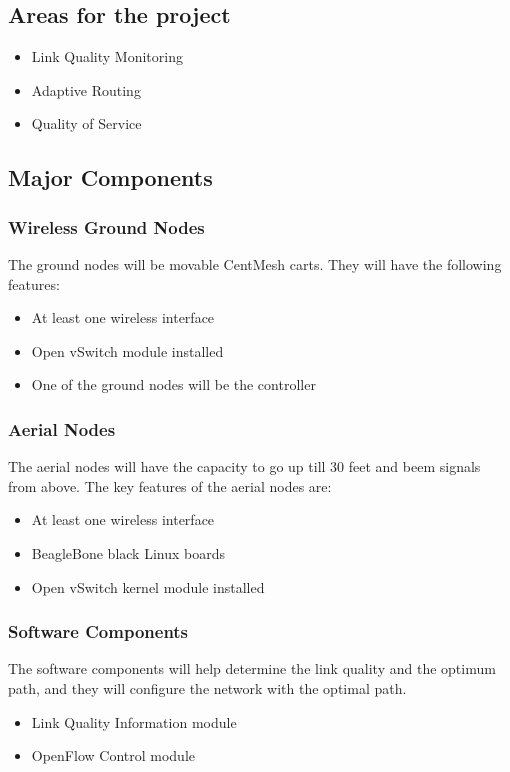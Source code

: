 \documentclass{article}
\begin{document}
\subsection{Areas for the project}
\begin{itemize}
\item Link Quality Monitoring
\item Adaptive Routing
\item Quality of Service
\end{itemize}
\subsection{Major Components}
\subsubsection{Wireless Ground Nodes}
The ground nodes will be movable CentMesh carts. They will have the following features:
\begin{itemize}
\item At least one wireless interface
\item Open vSwitch module installed
\item One of the ground nodes will be the controller
\end{itemize}
\subsubsection{Aerial Nodes}
The aerial nodes will have the capacity to go up till 30 feet and beem signals from above. The key features of the
aerial nodes are:
\begin{itemize}
\item At least one wireless interface
\item BeagleBone black Linux boards
\item Open vSwitch kernel module installed
\end{itemize}
\subsubsection{Software Components}
The software components will help determine the link quality and the optimum path, and they will configure the network
with the optimal path.
\begin{itemize}
\item Link Quality Information module
\item OpenFlow Control module
\end{itemize}
\end{document}
